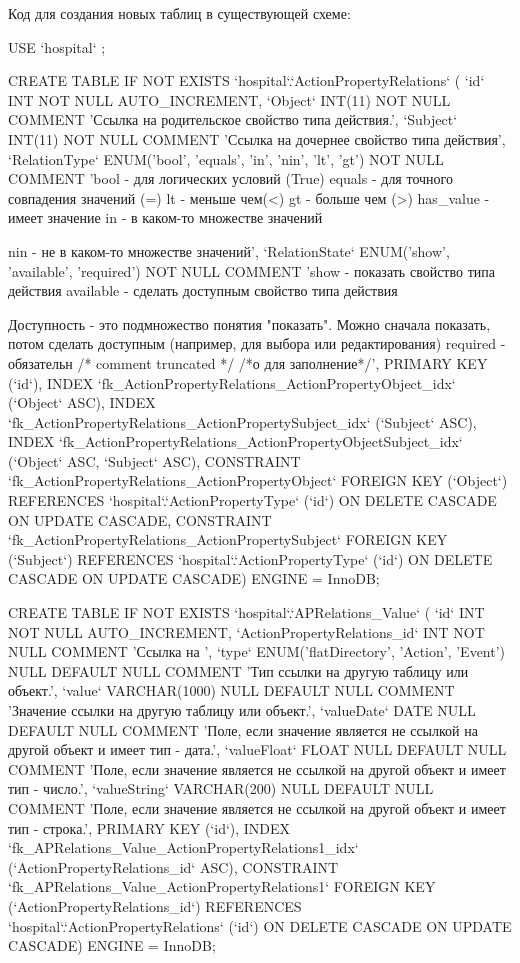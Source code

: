 \documentclass[a4paper,8pt]{report} %
\begin{document}
{    Код для создания новых таблиц в существующей схеме:

    USE `hospital` ;

    CREATE TABLE IF NOT EXISTS `hospital`.`ActionPropertyRelations` (
    `id` INT NOT NULL AUTO\_INCREMENT,
    `Object` INT(11) NOT NULL COMMENT 'Ссылка на родительское свойство типа действия.',
    `Subject` INT(11) NOT NULL COMMENT 'Ссылка на дочернее свойство типа действия',
    `RelationType` ENUM('bool', 'equals', 'in', 'nin', 'lt', 'gt') NOT NULL COMMENT 'bool - для
    логических условий (True)
    equals - для точного совпадения значений (=)
    lt - меньше чем(<)
    gt - больше чем (>)
    has\_value - имеет значение
    in - в каком-то множестве значений

    nin - не в каком-то множестве значений',
    `RelationState` ENUM('show', 'available', 'required') NOT NULL COMMENT 'show - показать
    свойство типа действия
    available - сделать доступным свойство типа действия

    Доступность - это подмножество понятия "показать". Можно сначала показать, потом
    сделать доступным (например, для выбора или редактирования)
    required - обязательн /*
    comment truncated */ /*о для заполнение*/',
    PRIMARY KEY (`id`),
    INDEX `fk\_ActionPropertyRelations\_ActionPropertyObject\_idx` (`Object` ASC),
    INDEX `fk\_ActionPropertyRelations\_ActionPropertySubject\_idx` (`Subject` ASC),
    INDEX `fk\_ActionPropertyRelations\_ActionPropertyObjectSubject\_idx` (`Object` ASC, `Subject`
    ASC),
    CONSTRAINT `fk\_ActionPropertyRelations\_ActionPropertyObject`
    FOREIGN KEY (`Object`)
    REFERENCES `hospital`.`ActionPropertyType` (`id`)
    ON DELETE CASCADE
    ON UPDATE CASCADE,
    CONSTRAINT `fk\_ActionPropertyRelations\_ActionPropertySubject`
    FOREIGN KEY (`Subject`)
    REFERENCES `hospital`.`ActionPropertyType` (`id`)
    ON DELETE CASCADE
    ON UPDATE CASCADE)
    ENGINE = InnoDB;

    CREATE TABLE IF NOT EXISTS `hospital`.`APRelations\_Value` (
    `id` INT NOT NULL AUTO\_INCREMENT,
    `ActionPropertyRelations\_id` INT NOT NULL COMMENT 'Ссылка на ',
    `type` ENUM('flatDirectory', 'Action', 'Event') NULL DEFAULT NULL COMMENT 'Тип ссылки на
    другую таблицу или объект.',
    `value` VARCHAR(1000) NULL DEFAULT NULL COMMENT 'Значение ссылки на другую
    таблицу или объект.',
    `valueDate` DATE NULL DEFAULT NULL COMMENT 'Поле, если значение является не
    ссылкой на другой объект и имеет тип - дата.',
    `valueFloat` FLOAT NULL DEFAULT NULL COMMENT 'Поле, если значение является не
    ссылкой на другой объект и имеет тип - число.',
    `valueString` VARCHAR(200) NULL DEFAULT NULL COMMENT 'Поле, если значение
    является не ссылкой на другой объект и имеет тип - строка.',
    PRIMARY KEY (`id`),
    INDEX `fk\_APRelations\_Value\_ActionPropertyRelations1\_idx` (`ActionPropertyRelations\_id`
    ASC),
    CONSTRAINT `fk\_APRelations\_Value\_ActionPropertyRelations1`
    FOREIGN KEY (`ActionPropertyRelations\_id`)
    REFERENCES `hospital`.`ActionPropertyRelations` (`id`)
    ON DELETE CASCADE
    ON UPDATE CASCADE)
    ENGINE = InnoDB;

}
\end{document}
